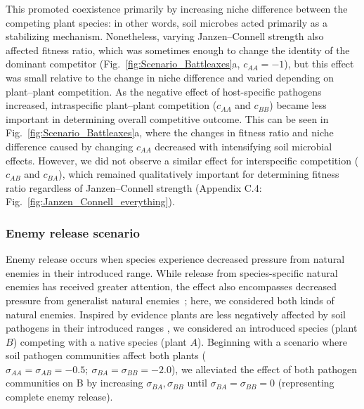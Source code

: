 This promoted coexistence primarily by increasing niche difference between the competing plant species: in other words, soil microbes acted primarily as a stabilizing mechanism. Nonetheless, varying Janzen--Connell strength also affected fitness ratio, which was sometimes enough to change the identity of the dominant competitor (Fig.~\ref{fig:Scenario_Battleaxes}a, $c_{AA} = -1$), but this effect was small relative to the change in niche difference and varied depending on plant--plant competition. As the negative effect of host-specific pathogens increased, intraspecific plant--plant competition ($c_{AA}$ and $c_{BB}$) became less important in determining overall competitive outcome. This can be seen in Fig.~\ref{fig:Scenario_Battleaxes}a, where the changes in fitness ratio and niche difference caused by changing $c_{AA}$ decreased with intensifying soil microbial effects. However, we did not observe a similar effect for interspecific competition ($c_{AB}$ and $c_{BA}$), which remained qualitatively important for determining fitness ratio regardless of Janzen--Connell strength (Appendix C.4: Fig.~\ref{fig:Janzen_Connell_everything}).
\par



\subsubsection*{Enemy release scenario}
Enemy release occurs when species experience decreased pressure from natural enemies in their introduced range. While release from species-specific natural enemies has received greater attention, the effect also encompasses decreased pressure from generalist natural enemies~\citep{Keane2002}; here, we considered both kinds of natural enemies. Inspired by evidence plants are less negatively affected by soil pathogens in their introduced ranges \citep{Reinhart2006}, we considered an introduced species (plant $B$) competing with a native species (plant $A$). Beginning with a scenario where soil pathogen communities affect both plants ($\sigma_{AA} = \sigma_{AB} = -0.5;\ \sigma_{BA} = \sigma_{BB} = -2.0$), we alleviated the effect of both pathogen communities on B by increasing $\sigma_{BA}, \sigma_{BB}$ until $\sigma_{BA} = \sigma_{BB} = 0$ (representing complete enemy release).
\par


